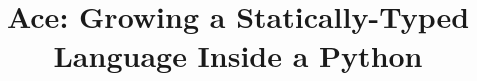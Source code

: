 \documentclass[9pt,preprint]{sigplanconf}
\begin{document}
\conferenceinfo{-}{-} 
\copyrightyear{-} 
\copyrightdata{[to be supplied]} 


\newcommand{\Ace}{\textsf{Ace}}

\title{\Ace: Growing a Statically-Typed Language Inside a Python}

\authorinfo{~}{~}{~}

\maketitle
\end{document}
